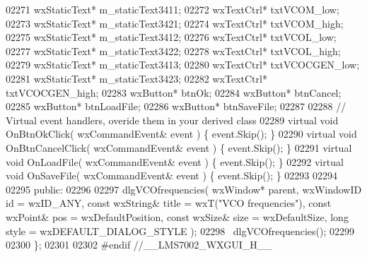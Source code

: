\begin{DoxyCode}
02271         wxStaticText* m_staticText3411;
02272         wxTextCtrl* txtVCOM_low;
02273         wxStaticText* m_staticText3421;
02274         wxTextCtrl* txtVCOM_high;
02275         wxStaticText* m_staticText3412;
02276         wxTextCtrl* txtVCOL_low;
02277         wxStaticText* m_staticText3422;
02278         wxTextCtrl* txtVCOL_high;
02279         wxStaticText* m_staticText3413;
02280         wxTextCtrl* txtVCOCGEN_low;
02281         wxStaticText* m_staticText3423;
02282         wxTextCtrl* txtVCOCGEN_high;
02283         wxButton* btnOk;
02284         wxButton* btnCancel;
02285         wxButton* btnLoadFile;
02286         wxButton* btnSaveFile;
02287         
02288         \textcolor{comment}{// Virtual event handlers, overide them in your derived class}
02289         \textcolor{keyword}{virtual} \textcolor{keywordtype}{void} OnBtnOkClick( wxCommandEvent& event ) \{ \textcolor{keyword}{event}.Skip(); \}
02290         \textcolor{keyword}{virtual} \textcolor{keywordtype}{void} OnBtnCancelClick( wxCommandEvent& event ) \{ \textcolor{keyword}{event}.Skip(); \}
02291         \textcolor{keyword}{virtual} \textcolor{keywordtype}{void} OnLoadFile( wxCommandEvent& event ) \{ \textcolor{keyword}{event}.Skip(); \}
02292         \textcolor{keyword}{virtual} \textcolor{keywordtype}{void} OnSaveFile( wxCommandEvent& event ) \{ \textcolor{keyword}{event}.Skip(); \}
02293         
02294     
02295     \textcolor{keyword}{public}:
02296         
02297         dlgVCOfrequencies( wxWindow* parent, wxWindowID \textcolor{keywordtype}{id} = wxID\_ANY, \textcolor{keyword}{const} wxString& title = wxT(\textcolor{stringliteral}{"VCO
       frequencies"}), \textcolor{keyword}{const} wxPoint& pos = wxDefaultPosition, \textcolor{keyword}{const} wxSize& size = wxDefaultSize, \textcolor{keywordtype}{long} style = 
      wxDEFAULT\_DIALOG\_STYLE ); 
02298         ~dlgVCOfrequencies();
02299     
02300 \};
02301 
02302 \textcolor{preprocessor}{#endif //\_\_LMS7002\_WXGUI\_H\_\_}
\end{DoxyCode}
